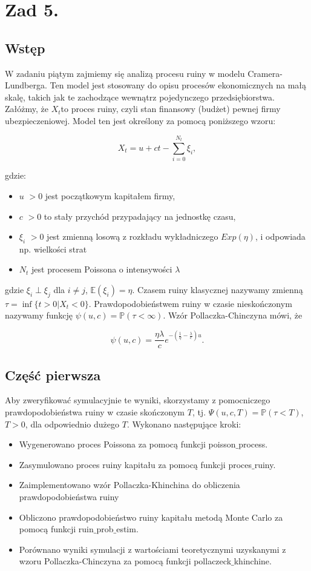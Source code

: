 \documentclass[12pt,letterpaper]{article}
\theoremstyle{definition}
\begin{document}
\section{Zad 5.}
\subsection{Wstęp}
W zadaniu piątym zajmiemy się analizą procesu ruiny w modelu Cramera-Lundberga. Ten model jest stosowany do opisu procesów ekonomicznych na małą skalę, takich jak te zachodzące wewnątrz pojedynczego przedsiębiorstwa. Załóżmy, że $X_t$to proces ruiny, czyli stan finansowy (budżet) pewnej firmy ubezpieczeniowej. Model ten jest określony za pomocą poniższego wzoru:
\begin{center}
    \[
    X_t = u + ct - \sum_{i=0}^{N_t} \xi_i,
    \]
\end{center}

gdzie:
\begin{itemize}
    \item \( u \) $> 0$ jest początkowym kapitałem firmy,
    \item \( c \) $> 0$ to stały przychód przypadający na jednostkę czasu,
    \item \( \xi_i \) $> 0$ jest zmienną losową z rozkładu wykładniczego $Exp(\eta)$, i odpowiada np. wielkości strat 
    \item \( N_t \) jest procesem Poissona o intensywości $\lambda$
\end{itemize}
gdzie  \( \xi_i \perp \xi_j \) dla \( i \neq j \), \( \mathbb{E}(\xi_i) = \eta \). Czasem ruiny klasycznej nazywamy zmienną \( \tau = \inf\{ t > 0 | X_t < 0 \} \). Prawdopodobieństwem ruiny w czasie nieskończonym nazywamy funkcję \( \psi(u, c) = \mathbb{P}(\tau < \infty) \). Wzór Pollaczka-Chinczyna mówi, że
\begin{center}
    \[
\psi(u, c) = \frac{\eta \lambda}{c} e^{-\left( \frac{1}{\eta} - \frac{\lambda}{c} \right)u}.
\]
\end{center}
\subsection{Część pierwsza}
Aby zweryfikować symulacyjnie te wyniki, skorzystamy z pomocniczego prawdopodobieństwa ruiny w czasie skończonym \( T \), tj. \( \Psi(u, c, T) = \mathbb{P}(\tau < T) \), \( T > 0 \), dla odpowiednio dużego \( T \). Wykonano następujące kroki:
\begin{itemize}
    \item Wygenerowano proces Poissona za pomocą funkcji poisson$\_$process.
    \item Zasymulowano proces ruiny kapitału za pomocą funkcji proces$\_$ruiny.
    \item Zaimplementowano wzór Pollaczka-Khinchina do obliczenia prawdopodobieństwa ruiny
    \item Obliczono prawdopodobieństwo ruiny kapitału metodą Monte Carlo za pomocą funkcji ruin$\_$prob$\_$estim.
    \item Porównano wyniki symulacji z wartościami teoretycznymi uzyskanymi z wzoru Pollaczka-Chinczyna za pomocą funkcji pollaczeck$\_$khinchine.
    
\end{itemize}
\end{document}
